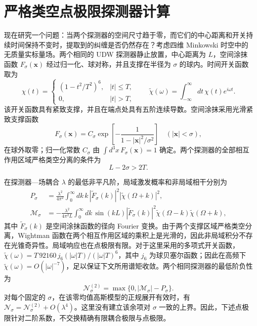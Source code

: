 \documentclass[UTF8,11pt,a4paper,fontset=none]{ctexart}
\begin{document}
\section{严格类空点极限探测器计算}
\label{app:pointlike-detectors}


现在研究一个问题：当两个探测器的空间尺寸趋于零，而它们的中心距离和开关持续时间保持不变时，提取到的纠缠是否仍然存在？考虑四维 Minkowski 时空中的无质量实标量场。两个相同的 UDW 探测器静止放置，中心距离为 $L$，空间涂抹函数 $F_\sigma(\mathbf x)$ 经过归一化、球对称，并且支撑在半径为 $\sigma$ 的球内。时间开关函数取为
\begin{equation}
\chi(t)=
\begin{cases}
(1-t^2/T^2)^6,& |t|\leq T,\\
0,& |t|>T,
\end{cases}
\qquad
\widetilde\chi(\omega)=\int_{-\infty}^{\infty}dt\,\chi(t)e^{i\omega t}.
\label{eq:pointlike-switch}
\end{equation}
该开关函数具有紧致支撑，并且在端点处具有五阶连续导数。空间涂抹采用光滑紧致支撑函数
\begin{equation}
F_\sigma(\mathbf x)=C_\sigma
\exp\!\left[-\frac{1}{1-|\mathbf x|^2/\sigma^2}\right]
\quad (|\mathbf x|<\sigma),
\label{eq:pointlike-profile}
\end{equation}
在球外取零；归一化常数 $C_\sigma$ 由 $\int d^3x\,F_\sigma(\mathbf x)=1$ 确定。两个探测器的全部相互作用区域严格类空分离的条件为
\begin{equation}
L-2\sigma>2T.
\label{eq:pointlike-spacelike}
\end{equation}

在探测器—场耦合 $\lambda$ 的最低非平凡阶，局域激发概率和非局域相干分别为
\begin{align}
P_\sigma&=\frac{\lambda^2}{4\pi^2}
\int_0^\infty dk\,k\,|\widetilde F_\sigma(k)|^2
|\widetilde\chi(\Omega+k)|^2,
\label{eq:pointlike-P}\\
\mathcal M_\sigma&=-\frac{\lambda^2}{4\pi^2L}
\int_0^\infty dk\,\sin(kL)|\widetilde F_\sigma(k)|^2
\widetilde\chi(\Omega-k)\widetilde\chi(\Omega+k),
\label{eq:pointlike-M}
\end{align}
其中 $\widetilde F_\sigma(k)$ 是空间涂抹函数的径向 Fourier 变换。由于两个支撑区域严格类空分离，Wightman 函数在两个相互作用区域的乘积上是光滑的，因此非局域积分不存在光锥奇异性。局域响应也在点极限有限。对于这里采用的多项式开关函数，$\widetilde\chi(\omega)=T\,92160\,j_6(|\omega|T)/(|\omega|T)^6$，其中 $j_6$ 为球贝塞尔函数；因此在高频下 $\widetilde\chi(\omega)=O(|\omega|^{-7})$，足以保证下文所用谱矩收敛。两个相同探测器的最低阶负性为
\begin{equation}
\mathcal N_\sigma^{(2)}=
\max\{0,|\mathcal M_\sigma|-P_\sigma\}.
\label{eq:pointlike-negativity}
\end{equation}
对每个固定的 $\sigma$，在该零均值高斯模型的正规展开有效时，有 $\mathcal N_\sigma=\mathcal N_\sigma^{(2)}+O(\lambda^4)$。这里没有建立该余项对 $\sigma$ 一致的上界。因此，下述点极限针对二阶系数，不交换精确有限耦合极限与点极限。
\end{document}
